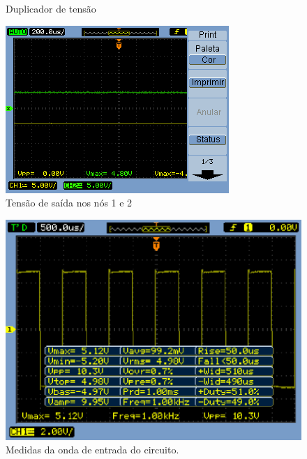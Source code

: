\documentclass[a4paper]{article} %
\begin{document}
 \setcounter{figure}{0}
\vspace{3mm}
\begin{figure}[h]
\centerline{}
\caption{Duplicador de tensão \label{tab:circ}}
\end{figure}

\newpage
\begin{figure}[h!]
\begin{centering}
\includegraphics[scale=0.55]{Imagens/3.4duplicador_tensao/423} \caption{Tensão de saída nos nós 1 e 2 \label{fig:dob-no12}}
\par\end{centering}
\end{figure}


\begin{figure}[h!]
\begin{centering}
\par\end{centering}
\end{figure}


\begin{figure}[h!]
\begin{centering}
\includegraphics[scale=0.55]{Imagens/3.4duplicador_tensao/Vinmedidas}
\par\end{centering}
\caption{ Medidas da onda de entrada do circuito. \label{fig:dob}}
\end{figure}
\end{document}
